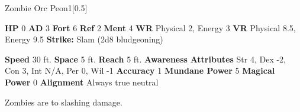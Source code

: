   \begin{monsubsection}{Zombie Orc Peon}{1}[0.5]
    \vspace{-1em}\vspace{-1em}
    \vspace{0em}

    
    

    \begin{spellcontent}
      \begin{spelltargetinginfo}
        \pari \textbf{HP} 0 \monsep
          \textbf{AD} 3 \monsep
          \textbf{Fort} 6 \monsep
          \textbf{Ref} 2 \monsep
          \textbf{Ment} 4
        \pari \textbf{WR} Physical 2, Energy 3 \monsep
        \textbf{VR} Physical 8.5, Energy 9.5
        \pari \textbf{Strike:}
            Slam  (2d8 bludgeoning)
      \end{spelltargetinginfo}
    \end{spellcontent}
    \begin{monsterfooter}
      \pari \textbf{Speed} 30 ft. \monsep
        \textbf{Space} 5 ft. \monsep
        \textbf{Reach} 5 ft.
      \pari \textbf{Awareness} 
      \pari \textbf{Attributes}
        Str 4, Dex -2,
        Con 3, Int N/A,
        Per 0, Wil -1
      \pari \textbf{Accuracy} 1 \monsep
        \textbf{Mundane Power} 5 \monsep
      \textbf{Magical Power} 0
      \pari \textbf{Alignment} Always true neutral
    \end{monsterfooter}
  \end{monsubsection}
          Zombies are  to slashing damage.
  

